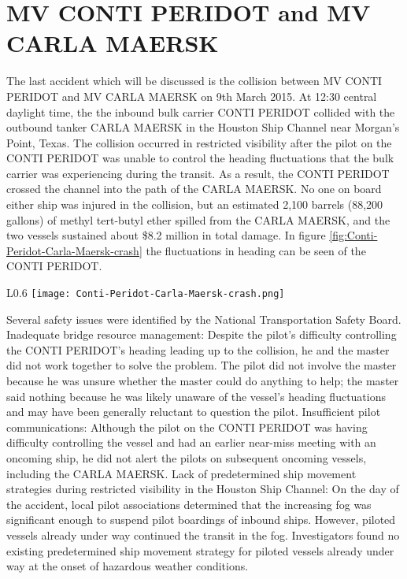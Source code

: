 \section{MV CONTI PERIDOT and MV CARLA MAERSK}
The last accident which will be discussed is the collision between MV CONTI PERIDOT and MV CARLA MAERSK on 9th March 2015. At 12:30 central daylight time, the the inbound bulk carrier CONTI PERIDOT collided with the outbound tanker CARLA MAERSK in the Houston Ship Channel near Morgan’s Point, Texas. The collision occurred in restricted visibility after the pilot on the CONTI PERIDOT was unable to control the heading fluctuations that the bulk carrier was experiencing during the transit. As a result, the CONTI PERIDOT crossed the channel into the path of the CARLA MAERSK. No one on board either ship was injured in the collision, but an estimated 2,100 barrels (88,200 gallons) of methyl tert-butyl ether spilled from the CARLA MAERSK, and the two vessels sustained about \$8.2 million in total damage. In figure \ref{fig:Conti-Peridot-Carla-Maersk-crash} the fluctuations in heading can be seen of the CONTI PERIDOT. 

\begin{wrapfigure}{L}{0.6\textwidth}
	\centering
	\texttt{[image: Conti-Peridot-Carla-Maersk-crash.png]}
	\caption{Illutstration map of approximate collision location}
	\label{fig:Conti-Peridot-Carla-Maersk-crash}
\end{wrapfigure}

Several safety issues were identified by the National Transportation Safety Board. Inadequate bridge resource management: Despite the pilot’s difficulty controlling the CONTI PERIDOT’s heading leading up to the collision, he and the master did not work together to solve the problem. The pilot did not involve the master because he was unsure whether the master could do anything to help; the master said nothing because he was likely unaware of the vessel’s heading fluctuations and may have been generally reluctant to question the pilot.
Insufficient pilot communications: Although the pilot on the CONTI PERIDOT was having difficulty controlling the vessel and had an earlier near-miss meeting with an oncoming ship, he did not alert the pilots on subsequent oncoming vessels, including the CARLA MAERSK.
Lack of predetermined ship movement strategies during restricted visibility in the Houston Ship Channel: On the day of the accident, local pilot associations  determined that the increasing fog was significant enough to suspend pilot boardings of inbound ships. However, piloted vessels already under way continued the transit in the fog. Investigators found no existing predetermined ship movement strategy for piloted vessels already under way at the onset of hazardous weather conditions.

